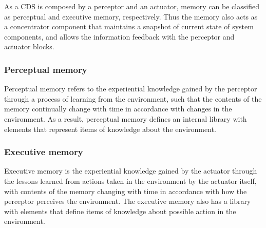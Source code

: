 \documentclass[ENG,PhD]{cinvestav}
\begin{document}
As a CDS is composed by a perceptor and an actuator, memory can be classified as perceptual and executive memory, respectively.
Thus the memory also acts as a concentrator component that maintains a snapshot of current state of system components, and allows the information feedback with the perceptor and actuator blocks.

\subsubsection*{Perceptual memory}
Perceptual memory refers to the experiential knowledge gained by the perceptor through a process of learning from the environment, such that the contents of the memory continually change with time in accordance with changes in the environment. %
As a result, perceptual memory defines an internal library with elements that represent items of knowledge about the environment.

\subsubsection*{Executive memory}
Executive memory is the experiential knowledge gained by the actuator through the lessons learned from actions taken in the environment by the actuator itself, with contents of the memory changing with time in accordance with how the perceptor perceives the environment. %
The executive memory also has a library with elements that define items of knowledge about possible action in the environment.
\end{document}
